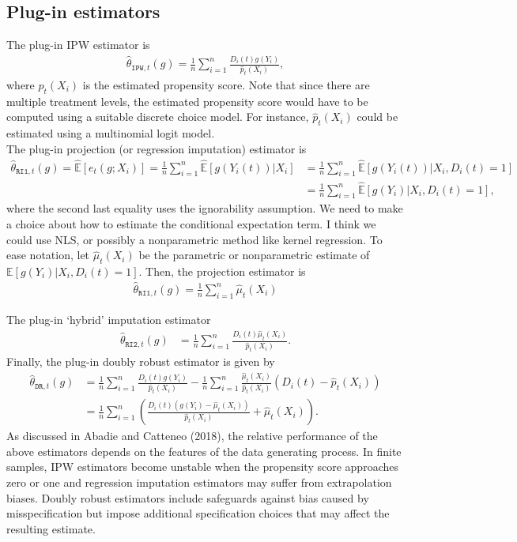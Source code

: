 \documentclass[12pt]{article}
\newcommand{\E}{\mathbb{E}}
\newcommand{\mtx}[1]{\ensuremath{\bm{\mathit{#1}}}}
\begin{document}
\subsection{Plug-in estimators}
The plug-in IPW estimator is 
\begin{align*}
\hat{\theta}_{\texttt{IPW},t}(g) = \frac{1}{n}\sum_{i=1}^n\frac{D_i(t)g(Y_i)}{\hat p_t(\mtx{X}_i)},
\end{align*}
where $\hat p_t(\mtx{X}_i)$ is the estimated propensity score. Note that since there are multiple treatment levels, the estimated propensity score would have to be computed using a suitable discrete choice model. For instance, $\hat p_t(\mtx{X}_i)$ could be estimated using a multinomial logit model.\\

The plug-in projection (or regression imputation) estimator is
\begin{align*}
\hat{\theta}_{\texttt{RI1},t}(g) = \hat{\E}[e_t(g;\mtx{X}_i)] =  \frac{1}{n}\sum_{i=1}^n \hat{\E}[g(Y_i(t))|\mtx{X}_i] &=  \frac{1}{n}\sum_{i=1}^n \hat{\E}[g(Y_i(t))|\mtx{X}_i, D_i(t)=1] \\
&= \frac{1}{n}\sum_{i=1}^n \hat{\E}[g(Y_i)|\mtx{X}_i, D_i(t)=1],
\end{align*}
where the second last equality uses the ignorability assumption. We need to make a choice about how to estimate the conditional expectation term. I think we could use NLS, or possibly a nonparametric method like kernel regression. To ease notation, let $\widehat{\mu}_t(\mtx{X}_i)$ be the parametric or nonparametric estimate of $\E[g(Y_i)|\mtx{X}_i, D_i(t)=1]$. Then, the projection estimator is
\begin{align*}
\hat{\theta}_{\texttt{RI1},t}(g) = \frac{1}{n}\sum_{i=1}^n \widehat{\mu}_t(\mtx{X}_i)
\end{align*}

The plug-in `hybrid' imputation estimator
\begin{align*}
\hat{\theta}_{\texttt{RI2},t}(g) &=  \frac{1}{n}\sum_{i=1}^n\frac{D_i(t)\widehat{\mu}_t(\mtx{X}_i)}{\hat p_t(\mtx{X}_i)}. 
\end{align*}
Finally, the plug-in doubly robust estimator is given by
\begin{align*}
\hat{\theta}_{\texttt{DR},t}(g) &= \frac{1}{n}\sum_{i=1}^n\frac{D_i(t)g(Y_i)}{\hat p_t(\mtx{X}_i)}-\frac{1}{n}\sum_{i=1}^n\frac{\widehat{\mu}_t(\mtx{X}_i)}{\hat p_t(\mtx{X}_i)}(D_i(t) - \hat p_t(\mtx{X}_i))\\
&=\frac{1}{n}\sum_{i=1}^n \left(\frac{D_i(t)(g(Y_i) - \widehat{\mu}_t(\mtx{X}_i))}{\hat p_t(\mtx{X}_i)} + \widehat{\mu}_t(\mtx{X}_i) \right).
\end{align*}
As discussed in Abadie and Catteneo (2018), the relative performance of the above estimators depends on the features of the data generating process. In finite samples, IPW estimators become unstable when the propensity score approaches zero or one and regression imputation estimators may suffer from extrapolation biases. Doubly robust estimators include safeguards against bias caused by misspecification but impose additional specification choices that may affect the resulting estimate.
\end{document}
